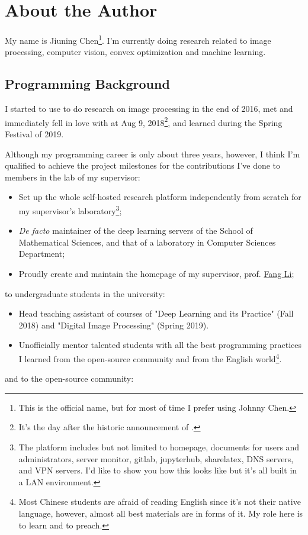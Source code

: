 
\section{About the Author}\label{sec:about_author}

My name is \textsf{Jiuning Chen}\footnote{This is the official name, but for most of time I prefer using \textsf{Johnny Chen}.}. I'm currently doing research related to image processing, computer vision, convex optimization and machine learning.\par

\subsection{Programming Background}

I started to use \langmatlab to do research on image processing in the end of 2016, met and immediately fell in love with \langjulia at Aug 9, 2018\footnote{It's the day after the historic announcement of \langjulia {}.}, and learned \python during the Spring Festival of 2019. \par

Although my programming career is only about three years, however, I think I'm qualified to achieve the project milestones for the contributions I've done to members in the lab of my supervisor:

\begin{itemize}
    \item Set up the whole self-hosted research platform independently from scratch for my supervisor's laboratory\footnote{The platform includes but not limited to homepage, documents for users and administrators, server monitor, gitlab, jupyterhub, sharelatex, DNS servers, and VPN servers. I'd like to show you how this looks like but it's all built in a LAN environment.};
    \item \textit{De facto} maintainer of the deep learning servers of the School of Mathematical Sciences, and that of a laboratory in Computer Sciences Department;
    \item Proudly create and maintain the homepage of my supervisor, prof. \href{http://math.ecnu.edu.cn/~fli/}{\textsf{Fang Li}};
\end{itemize}
to undergraduate students in the university:
\begin{itemize}
    \item Head teaching assistant of courses of "Deep Learning and its Practice" (Fall 2018) and "Digital Image Processing" (Spring 2019).
    \item Unofficially mentor talented students with all the best programming practices I learned from the open-source community and from the English world\footnote{Most Chinese students are afraid of reading English since it's not their native language, however, almost all best materials are in forms of it. My role here is to learn and to preach.}.
\end{itemize}
and to the open-source community:

